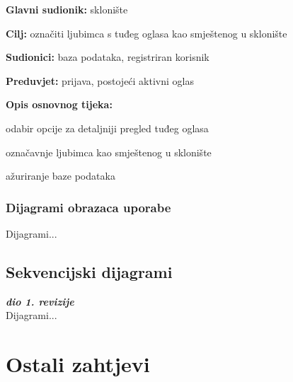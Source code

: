						\noindent {}
					\begin{packed_item}
						
						\item \textbf{Glavni sudionik: } sklonište
						\item  \textbf{Cilj:} označiti ljubimca s tuđeg oglasa kao smještenog u sklonište
						\item  \textbf{Sudionici:} baza podataka, registriran korisnik
						\item  \textbf{Preduvjet:} prijava, postojeći aktivni oglas
						\item  \textbf{Opis osnovnog tijeka:}
						
						\item[] \begin{packed_enum}
							
							\item odabir opcije za detaljniji pregled tuđeg oglasa
							\item označavnje ljubimca kao smještenog u sklonište
							\item ažuriranje baze podataka
						\end{packed_enum}
						
					\end{packed_item}
					
					
					
					
					
				\subsubsection{Dijagrami obrazaca uporabe}
					
					Dijagrami...
				\eject		
				
			\subsection{Sekvencijski dijagrami}
				
				\textbf{\textit{dio 1. revizije}}\\
				
				Dijagrami...
				\eject
	
		\section{Ostali zahtjevi}
		 

